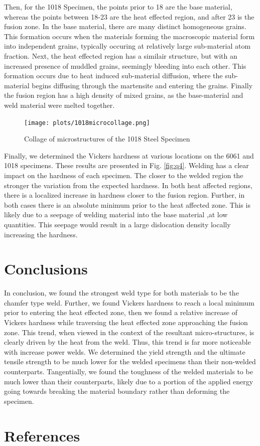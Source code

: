 \documentclass{article}
\begin{document}
\newpage
Then, for the 1018 Specimen, the points prior to 18 are the base material, whereas the points between 18-23 are the heat effected region, and after 23 is the fusion zone. In the base material, there are many distinct homogeneous grains. This formation occurs when the materials forming the macroscopic material form into independent grains, typically occuring at relatively large sub-material atom fraction. Next, the heat effected region has a similair structure, but with an increased presence of muddled grains, seemingly bleeding into each other. This formation occurs due to heat induced sub-material diffusion, where the sub-material begins diffusing through the martensite and entering the grains. Finally the fusion region has a high density of mixed grains, as the base-material and weld material were melted together. 
\begin{figure}[!hp!]
    \centering
    \texttt{[image: plots/1018microcollage.png]}
    \caption{Collage of microstructures of the 1018 Steel Specimen}
    \label{fig:1018}
\end{figure}
\newpage
Finally, we determined the Vickers hardness at various locations on the 6061 and 1018 specimens. These results are presented in Fig. \ref{fig:q4}.
Welding has a clear impact on the hardness of each specimen. The closer to the welded region the stronger the variation from the expected hardness. In both heat affected regions, there is a localized increase in hardness closer to the fusion region. Further, in both cases there is an absolute minimum prior to the heat affected zone. This is likely due to a seepage of welding material into the base material ,at low quantities. This seepage would result in a large dislocation density locally increasing the hardness.

\section{Conclusions}
In conclusion, we found the strongest weld type for both materials to be the chamfer type weld. Further, we found Vickers hardness to reach a local minimum prior to entering the heat effected zone, then we found a relative increase of Vickers hardness while traversing the heat effected zone approaching the fusion zone. This trend, when viewed in the context of the resultant micro-structures, is clearly driven by the heat from the weld. Thus, this trend is far more noticeable with increase power welds. We determined the yield strength and the ultimate tensile strength to be much lower for the welded specimens than their non-welded counterparts. Tangentially, we found the toughness of the welded materials to be much lower than their counterparts, likely due to a portion of the applied energy going towards breaking the material boundary rather than deforming the specimen. 
\section{References}

\printbibliography[heading = none]
\end{document}
